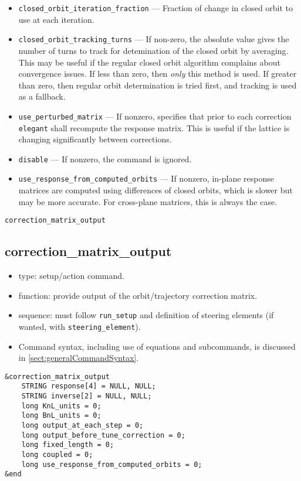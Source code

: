 \documentclass[11pt]{article}
\begin{document}
\begin{itemize}
\item \verb|closed_orbit_iteration_fraction| --- Fraction of change in closed orbit to
use at each iteration.
\item \verb|closed_orbit_tracking_turns| --- If non-zero, the absolute value gives the number of turns to track for detemination 
  of the closed orbit by averaging. This may be useful if the regular closed orbit algorithm
  complains about convergence issues. If less than zero, then {\em only} this method is used. If greater than zero, 
  then regular orbit determination is tried first, and tracking is used as a fallback.
\item \verb|use_perturbed_matrix| --- If nonzero, specifies that prior to each 
	correction \verb|elegant| shall recompute the response matrix.  This
	is useful if the lattice is changing significantly between corrections.
\item \verb|disable| --- If nonzero, the command is ignored.
\item \verb|use_response_from_computed_orbits| --- If nonzero, in-plane response matrices are computed
  using differences of closed orbits, which is slower but may be more accurate. For cross-plane matrices, this is always the case.
\end{itemize}

\newpage
\begin{center}{\Large\verb|correction_matrix_output|}\end{center}
\subsection{correction\_matrix\_output \label{subsec:correctionmatrixoutput}}

\begin{itemize}
\item type: setup/action command.
\item function: provide output of the orbit/trajectory correction matrix.
\item sequence: must follow \verb|run_setup| and definition of steering elements (if wanted, with \verb|steering_element|).
\item Command syntax, including use of equations and subcommands, is discussed in \ref{sect:generalCommandSyntax}.
\end{itemize}

\begin{verbatim}
&correction_matrix_output
    STRING response[4] = NULL, NULL;
    STRING inverse[2] = NULL, NULL;
    long KnL_units = 0;
    long BnL_units = 0;
    long output_at_each_step = 0;
    long output_before_tune_correction = 0;
    long fixed_length = 0;
    long coupled = 0;
    long use_response_from_computed_orbits = 0;
&end
\end{verbatim}
\end{document}
